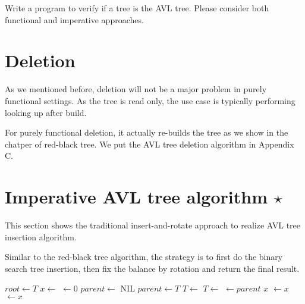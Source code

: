\documentclass[b5paper]{article}
\begin{document}
\begin{Exercise}
Write a program to verify if a tree is the AVL tree.
Please consider both functional and imperative approaches.
\end{Exercise}




\section{Deletion}

As we mentioned before, deletion will not be a major problem in
purely functional settings. As the tree is read only, the use case
is typically performing looking up after build.

For purely functional deletion, it actually re-builds the tree
as we show in the chatper of red-black tree. We put the AVL
tree deletion algorithm in Appendix C.

\section{Imperative AVL tree algorithm $\star$}

This section shows the traditional insert-and-rotate
approach to realize AVL tree insertion algorithm.

Similar to the red-black tree algorithm, the strategy
is to first do the binary search tree insertion,
then fix the balance by rotation and return the final result.

\begin{algorithmic}[1]
  \State $root \gets T$
  \State $x \gets$ 
  \State {} $\gets 0$
  \State $parent \gets$ NIL
    \State $parent \gets T$
      \State $T \gets $ 
    \Else
      \State $T \gets $ 
    \EndIf
  \EndWhile
  \State {} $\gets parent$
   
    \State \Return $x$
    \State {} $\gets x$
  \Else
    \State {} $\gets x$
  \EndIf
  \State \Return {}
\EndFunction
\end{algorithmic}
\end{document}
